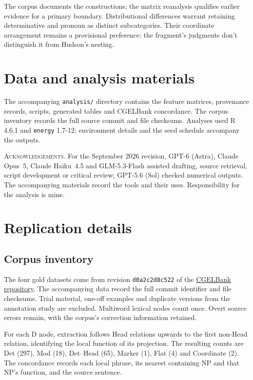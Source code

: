 \documentclass[12pt]{article}
\begin{document}
The corpus documents the constructions; the matrix reanalysis qualifies earlier evidence for a primary boundary. Distributional differences warrant retaining determinative and pronoun as distinct subcategories. Their coordinate arrangement remains a provisional preference: the fragment's judgments don't distinguish it from Hudson's nesting.

\section*{Data and analysis materials}

The accompanying \texttt{analysis/} directory contains the feature matrices, provenance records, scripts, generated tables and CGELBank concordance. The corpus inventory records the full source commit and file checksums. Analyses used R 4.6.1 and \texttt{energy} 1.7-12; environment details and the seed schedule accompany the outputs.

\vspace{0.5\baselineskip}
\noindent\textsc{Acknowledgements.} For the September 2026 revision, GPT-6 (Astra), Claude Opus~5, Claude Haiku~4.5 and GLM-5.3-Flash assisted drafting, source retrieval, script development or critical review; GPT-5.6 (Sol) checked numerical outputs. The accompanying materials record the tools and their uses. Responsibility for the analysis is mine.

\appendix
\section{Replication details}\label{app:replication}

\subsection{Corpus inventory}

The four gold datasets come from revision \texttt{d0a2c2d8c522} of the \href{https://github.com/nert-nlp/cgel}{CGELBank repository}. The accompanying data record the full commit identifier and file checksums. Trial material, one-off examples and duplicate versions from the annotation study are excluded. Multiword lexical nodes count once. Overt source errors remain, with the corpus's correction information retained.

For each D node, extraction follows Head relations upwards to the first non-Head relation, identifying the local function of its projection. The resulting counts are Det (297), Mod (18), Det--Head (65), Marker (1), Flat (4) and Coordinate (2). The concordance records each local phrase, its nearest containing NP and that NP's function, and the source sentence.
\end{document}
